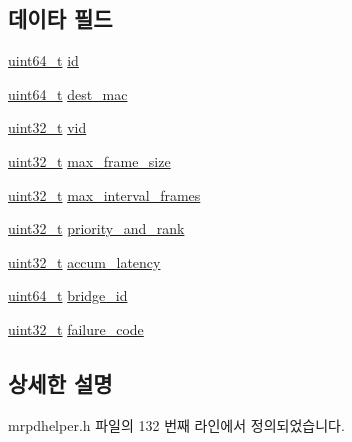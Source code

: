 \subsection*{데이타 필드}
\begin{DoxyCompactItemize}
\item 
\hyperlink{parse_8c_aec6fcb673ff035718c238c8c9d544c47}{uint64\+\_\+t} \hyperlink{structmrpdhelper__msrp__talker_a7e290573ef1be67b92a2c745e3b00d1d}{id}
\item 
\hyperlink{parse_8c_aec6fcb673ff035718c238c8c9d544c47}{uint64\+\_\+t} \hyperlink{structmrpdhelper__msrp__talker_a205a8c33627111589223916ef80462c2}{dest\+\_\+mac}
\item 
\hyperlink{parse_8c_a6eb1e68cc391dd753bc8ce896dbb8315}{uint32\+\_\+t} \hyperlink{structmrpdhelper__msrp__talker_a98780fe4ab562a61abfd7870ea0910c3}{vid}
\item 
\hyperlink{parse_8c_a6eb1e68cc391dd753bc8ce896dbb8315}{uint32\+\_\+t} \hyperlink{structmrpdhelper__msrp__talker_a3ca95b8cd1c8829eec3f938f03831042}{max\+\_\+frame\+\_\+size}
\item 
\hyperlink{parse_8c_a6eb1e68cc391dd753bc8ce896dbb8315}{uint32\+\_\+t} \hyperlink{structmrpdhelper__msrp__talker_a039b8d4f5698032d8d33997781ce9ee1}{max\+\_\+interval\+\_\+frames}
\item 
\hyperlink{parse_8c_a6eb1e68cc391dd753bc8ce896dbb8315}{uint32\+\_\+t} \hyperlink{structmrpdhelper__msrp__talker_a1e87590ea941aced51cc9f8f27fd7995}{priority\+\_\+and\+\_\+rank}
\item 
\hyperlink{parse_8c_a6eb1e68cc391dd753bc8ce896dbb8315}{uint32\+\_\+t} \hyperlink{structmrpdhelper__msrp__talker_abb60ac86605db899ea9f083ba1f93021}{accum\+\_\+latency}
\item 
\hyperlink{parse_8c_aec6fcb673ff035718c238c8c9d544c47}{uint64\+\_\+t} \hyperlink{structmrpdhelper__msrp__talker_a05d67b8dd71c3dcbd399e2b0add3e129}{bridge\+\_\+id}
\item 
\hyperlink{parse_8c_a6eb1e68cc391dd753bc8ce896dbb8315}{uint32\+\_\+t} \hyperlink{structmrpdhelper__msrp__talker_af52611e005cb886839fd40db54821d8a}{failure\+\_\+code}
\end{DoxyCompactItemize}


\subsection{상세한 설명}


mrpdhelper.\+h 파일의 132 번째 라인에서 정의되었습니다.



